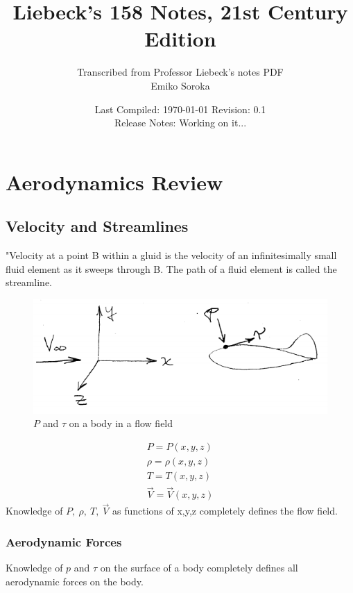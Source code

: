 \documentclass[draft=false, titlepage]{article}
\title{Liebeck's 158 Notes, 21st Century Edition}
\author{Transcribed from Professor Liebeck's notes PDF\\
	\small Emiko Soroka}
\date{Last Compiled: \today\linebreak\linebreak
	\small Revision: 0.1\\
	Release Notes: Working on it...}
\begin{document}
\maketitle
\tableofcontents
\listoffigures
\listoftables
\pagebreak

\section{Aerodynamics Review}
\subsection{Velocity and Streamlines}
"Velocity at a point B within a gluid is the velocity of an infinitesimally small fluid element as it sweeps through B.
The path of a fluid element is called the streamline.

\begin{figure}[ht]
	\centering
	\includegraphics[width=0.5\linewidth]{Figures/p2_flowfield.PNG}
	\caption{$P$ and $\tau$ on a body in a flow field}
	\label{fig:p2_flowfield}
\end{figure}
\begin{gather*}
P = P(x,y,z)\\
\rho = \rho(x,y,z)\\
T = T(x,y,z)\\
\vec{V} = \vec{V}(x,y,z)
\end{gather*}
Knowledge of $P,\ \rho,\ T,\ \vec{V}$ as functions of x,y,z completely defines the flow field.

\subsubsection{Aerodynamic Forces}
Knowledge of $p$ and $\tau$ on the surface of a body completely defines all aerodynamic forces on the body.
\end{document}
